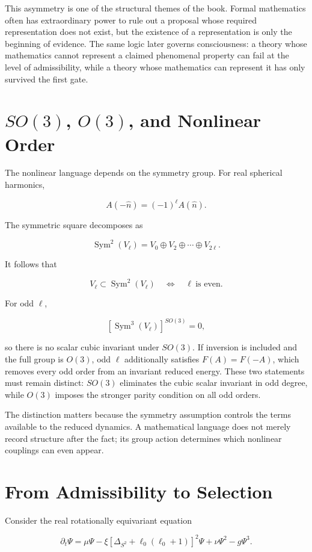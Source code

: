 This asymmetry is one of the structural themes of the book. Formal mathematics often has extraordinary power to rule out a proposal whose required representation does not exist, but the existence of a representation is only the beginning of evidence. The same logic later governs consciousness: a theory whose mathematics cannot represent a claimed phenomenal property can fail at the level of admissibility, while a theory whose mathematics can represent it has only survived the first gate.

\section{$SO(3)$, $O(3)$, and Nonlinear Order}

The nonlinear language depends on the symmetry group. For real spherical harmonics,

\[
A(-\hat n)=(-1)^\ell A(\hat n).
\]

The symmetric square decomposes as

\[
\operatorname{Sym}^2(V_\ell)=V_0\oplus V_2\oplus\cdots\oplus V_{2\ell}.
\]

It follows that

\[
V_\ell\subset\operatorname{Sym}^2(V_\ell)
\quad\Longleftrightarrow\quad
\ell\ \text{is even}.
\]

For odd $\ell$,

\[
[\operatorname{Sym}^3(V_\ell)]^{SO(3)}=0,
\]

so there is no scalar cubic invariant under $SO(3)$. If inversion is included and the full group is $O(3)$, odd $\ell$ additionally satisfies $F(A)=F(-A)$, which removes every odd order from an invariant reduced energy. These two statements must remain distinct: $SO(3)$ eliminates the cubic scalar invariant in odd degree, while $O(3)$ imposes the stronger parity condition on all odd orders.

The distinction matters because the symmetry assumption controls the terms available to the reduced dynamics. A mathematical language does not merely record structure after the fact; its group action determines which nonlinear couplings can even appear.

\section{From Admissibility to Selection}

Consider the real rotationally equivariant equation

\[
\partial_t\Psi=\mu\Psi-\xi[\Delta_{S^2}+\ell_0(\ell_0+1)]^2\Psi+\nu\Psi^2-g\Psi^3.
\]

